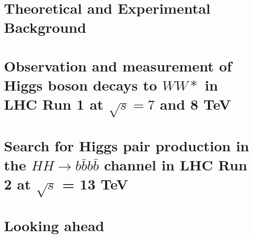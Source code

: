\documentclass{Dissertate}
\begin{document}


\maketitle
\copyrightpage

\abstractpage
\tableofcontents
\listoffigures
\listoftables
\dedicationpage
\acknowledgments

\doublespacing

\newcommand\HWWfull          {$H\rightarrow WW^{*}\rightarrow \ell\nu\ell\nu$ }


\setcounter{chapter}{-1}  %

\part{Theoretical and Experimental Background}



\part{Observation and measurement of Higgs boson decays to $WW*$ in LHC Run 1 at $\sqrt{s} = 7$ and 8 TeV}









\part{Search for Higgs pair production in the $HH\rightarrow
  b\bar{b}b\bar{b}$ channel in LHC Run 2 at $\sqrt{s}$ = 13 TeV}






\part{Looking ahead}

\begin{appendices}
   
   
\end{appendices}


\clearpage




\end{document}
